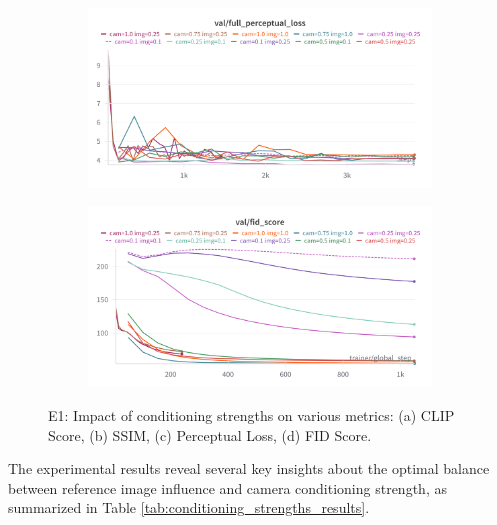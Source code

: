 \begin{figure}[htbp]
  \begin{subfigure}[b]{0.48\textwidth}
    \centering
    \includegraphics[width=\textwidth]{images/experiments/cam_img/perceptual.png}
    \label{fig:exp_cond_perceptual}
  \end{subfigure}
  \hfill
  \begin{subfigure}[b]{0.48\textwidth}
    \centering
    \includegraphics[width=\textwidth]{images/experiments/cam_img/fid.png}
    \label{fig:exp_cond_train_loss}
  \end{subfigure}

  \caption{E1: Impact of conditioning strengths on various metrics: (a) CLIP Score, (b) SSIM, (c) Perceptual Loss, (d) FID Score.}
  \label{fig:exp_cond_metrics_grid}
\end{figure}

The experimental results reveal several key insights about the optimal balance between reference image influence and camera conditioning strength, as summarized in Table \ref{tab:conditioning_strengths_results}.

